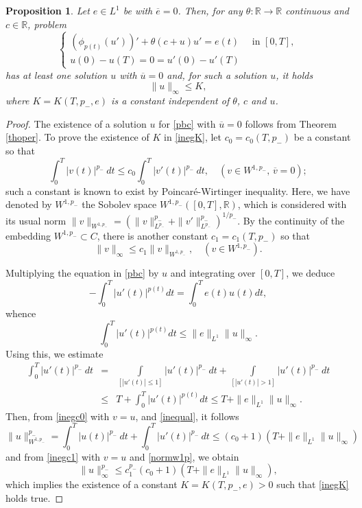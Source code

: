 \documentclass[11pt]{amsart}
\newtheorem{proposition}[theorem]{Proposition}
\numberwithin{equation}{section} \textwidth=15.5cm
\begin{document}
\begin{proposition}\label{lemaf0}
Let $e\in L^1$ be with $\overline{e}=0$. Then, for any $\theta:\mathbb{R}\to\mathbb{R}$ continuous and $c\in\mathbb{R}$, problem
\begin{equation}\label{pbc}
	\left \{
            \begin{array}{ll}
		      (\phi_{p(t)}(u'))'+\theta(c+u)u'=e(t)\quad \mbox{ in }[0,T],\\
		      u(0)-u(T)=0=u'(0)-u'(T)
			\end{array}
\right.
\end{equation}
has at least one solution $u$ with $\overline{u}=0$ and, for such a solution $u$, it holds
\begin{equation}\label{inegK}
    \|u\|_\infty\leq K,
\end{equation}
where $K=K(T,p_-,e)$ is a constant independent of $\theta$, $c$ and $u$.
\end{proposition}
\begin{proof}
The existence of a solution $u$ for \eqref{pbc} with $\overline{u}=0$ follows from Theorem \ref{thoper}. To prove the existence of $K$ in \eqref{inegK}, let $c_0=c_0(T,p_-)$ be a constant so that
\begin{equation}\label{inegc0}
  \int_0^T|v(t)|^{p_-}\ dt\leq c_0 \int_0^T|v'(t)|^{p_-}\ dt,\quad (v\in W^{1,p_-}, \, \overline{v}=0);
\end{equation}
such a constant is known to exist by Poincar\'{e}-Wirtinger inequality. Here, we have denoted by $W^{1,p_-}$ the Sobolev space $W^{1,p_-}([0,T], \mathbb{R})$, which is considered with its usual norm $\|v\|_{ W^{1,p_-}}=\left ( \|v\|_{ L^{p_-}}^{p_-}+\|v'\|_{ L^{p_-}}^{p_-}\right )^{1/p_{-}}$.  By the continuity of the embedding $W^{1,p_-}\subset C$, there is another constant $c_1=c_1(T,p_-)$ so that
\begin{equation}\label{inegc1}
    \|v\|_\infty\leq c_1 \|v\|_{ W^{1,p_-}}, \quad (v\in W^{1,p_-}).
\end{equation}

Multiplying the equation in \eqref{pbc} by $u$ and integrating over $[0, T]$, we deduce
$$-\int_0^T|u'(t)|^{p(t)}dt=\int_0^T e(t)u(t)dt,$$
whence
$$\int_0^T|u'(t)|^{p(t)}dt\leq\|e\|_{L^1}\|u\|_\infty.$$
Using this, we estimate
\begin{eqnarray}\label{inequal}
  \int_0^T|u'(t)|^{p_-}\ dt&=&\int\limits_{[|u'(t)|\leq 1]}|u'(t)|^{p_-}\ dt+\int\limits_{[|u'(t)|>1]}|u'(t)|^{p_-}\ dt\nonumber\\
  &\leq& T+\int_0^T|u'(t)|^{p(t)}dt\leq T+\|e\|_{L^1}\|u\|_\infty.
\end{eqnarray}
Then, from \eqref{inegc0} with $v=u$, and \eqref{inequal}, it follows
\begin{equation}\label{normw1p}
    \|u\|_{ W^{1,p_-}}^{p_-}=\int_0^T|u(t)|^{p_-}\ dt+\int_0^T|u'(t)|^{p_-}\ dt \leq(c_0+1)(T+\|e\|_{L^1}\|u\|_\infty)
\end{equation}
and from \eqref{inegc1} with $v=u$ and \eqref{normw1p}, we obtain
$$\|u\|_\infty^{p_-}\leq c_1^{p_-}(c_0+1)(T+\|e\|_{L^1}\|u\|_\infty),$$
which implies the existence of a constant $K=K(T,p_-,e)>0$ such that \eqref{inegK} holds true.
\end{proof}
\end{document}
